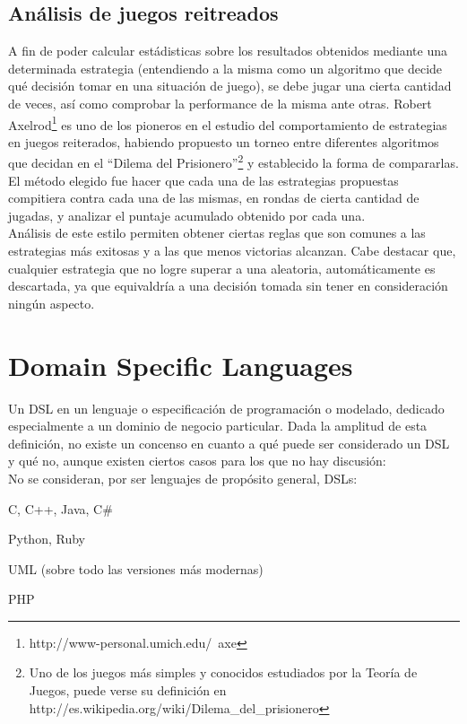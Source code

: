 \documentclass[10pt]{article}
\numberwithin{equation}{section}
\numberwithin{figure}{section}
\numberwithin{table}{section}
\begin{document}
\subsection{Análisis de juegos reitreados}
A fin de poder calcular estádisticas sobre los resultados obtenidos mediante una determinada estrategia (entendiendo a la misma como un algoritmo que decide qué decisión tomar en una situación de juego), se debe jugar una cierta cantidad de veces, así como comprobar la performance de la misma ante otras. Robert Axelrod\footnote{http://www-personal.umich.edu/~axe} es uno de los pioneros en el estudio del comportamiento de estrategias en juegos reiterados, habiendo propuesto un torneo entre diferentes algoritmos que decidan en el ``Dilema del Prisionero''\footnote{Uno de los juegos más simples y conocidos estudiados por la Teoría de Juegos, puede verse su definición en http://es.wikipedia.org/wiki/Dilema\_del\_prisionero} y establecido la forma de compararlas. El método elegido fue hacer que cada una de las estrategias propuestas compitiera contra cada una de las mismas, en rondas de cierta cantidad de jugadas, y analizar el puntaje acumulado obtenido por cada una.\cite{Axe:01}\\

Análisis de este estilo permiten obtener ciertas reglas que son comunes a las estrategias más exitosas y a las que menos victorias alcanzan. Cabe destacar que, cualquier estrategia que no logre superar a una aleatoria, automáticamente es descartada, ya que equivaldría a una decisión tomada sin tener en consideración ningún aspecto.

\newpage

\section{Domain Specific Languages}\label{dsls}
Un DSL en un lenguaje o especificación de programación o modelado, dedicado especialmente a un dominio de negocio particular. Dada la amplitud de esta definición, no existe un concenso en cuanto a qué puede ser considerado un DSL y qué no, aunque existen ciertos casos para los que no hay discusión:\\

No se consideran, por ser lenguajes de propósito general, DSLs:
\begin{list}{*}{}
  \item C, C++, Java, C\#
  \item Python, Ruby
  \item UML (sobre todo las versiones más modernas)
  \item PHP
\end{list}
\end{document}
